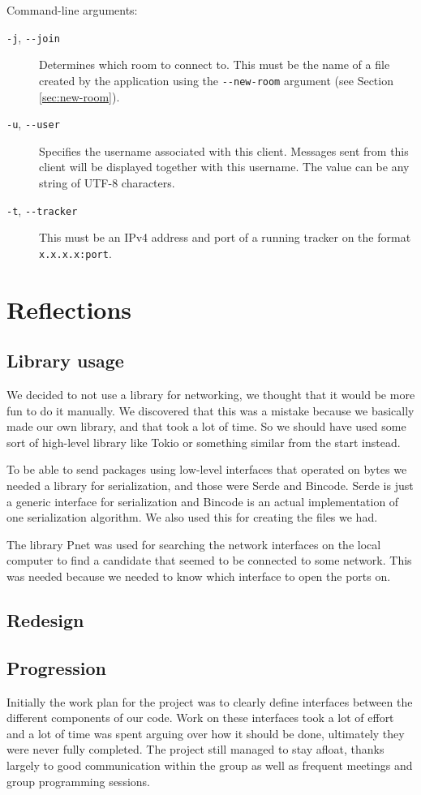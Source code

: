 \documentclass[12pt, a4paper]{article}
\begin{document}
Command-line arguments:
\begin{description}
\item[\texttt{-j}, \texttt{-{}-join}] Determines which room to connect to. This must be the name of a file created by the application using the \texttt{-{}-new-room} argument (see Section \ref{sec:new-room}).
\item[\texttt{-u}, \texttt{-{}-user}] Specifies the username associated with this client. Messages sent from this client will be displayed together with this username. The value can be any string of UTF-8 characters.
\item[\texttt{-t}, \texttt{-{}-tracker}] This must be an IPv4 address and port of a running tracker on the format \texttt{x.x.x.x:port}.
\end{description}

\section{Reflections}
\label{sec:refl}

\subsection{Library usage}
We decided to not use a library for networking, we thought that it would be more fun to do it manually. We discovered that this was a mistake because we basically made our own library, and that took a lot of time. So we should have used some sort of high-level library like Tokio or something similar from the start instead.

To be able to send packages using low-level interfaces that operated on bytes we needed a library for serialization, and those were Serde and Bincode. Serde is just a generic interface for serialization and Bincode is an actual implementation of one serialization algorithm. We also used this for creating the files we had.

The library Pnet was used for searching the network interfaces on the local computer to find a candidate that seemed to be connected to some network. This was needed because we needed to know which interface to open the ports on.

\subsection{Redesign}

\subsection{Progression}
Initially the work plan for the project was to clearly define interfaces between the different components of our code. Work on these interfaces took a lot of effort and a lot of time was spent arguing over how it should be done, ultimately they were never fully completed. The project still managed to stay afloat, thanks largely to good communication within the group as well as frequent meetings and group programming sessions.
\end{document}
